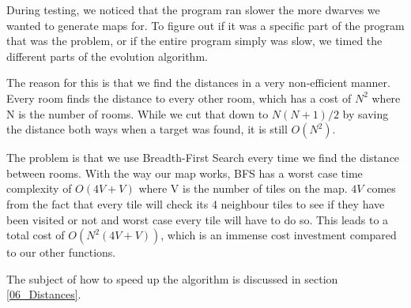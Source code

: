 During testing, we noticed that the program ran slower the more dwarves we wanted to generate maps for. To figure out if it was a specific part of the program that was the problem, or if the entire program simply was slow, we timed the different parts of the evolution algorithm.

The reason for this is that we find the distances in a very non-efficient manner. Every room finds the distance to every other room, which has a cost of $N^2$ where N is the number of rooms. While we cut that down to $N(N+1)/2$ by saving the distance both ways when a target was found, it is still $O(N^2)$.

The problem is that we use Breadth-First Search\cite{sedgewick4th}\cite{ucibfs} every time we find the distance between rooms. With the way our map works, BFS has a worst case time complexity of $O(4V + V)$ where V is the number of tiles on the map. $4V$ comes from the fact that every tile will check its 4 neighbour tiles to see if they have been visited or not and worst case every tile will have to do so. This leads to a total cost of $O(N^2 (4V+V))$, which is an immense cost investment compared to our other functions.

The subject of how to speed up the algorithm is discussed in section \ref{06_Distances}.





